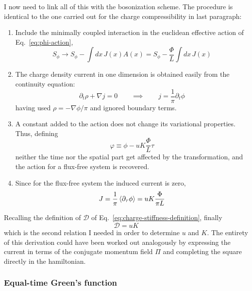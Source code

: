 I now need to link all of this with the bosonization scheme. The procedure is identical to the one carried out for the charge compressibility in last paragraph:
\begin{enumerate}
	\item Include the minimally coupled interaction in the euclidean effective action of Eq.~\eqref{eq:phi-action},
	\[
		S_\phi \to S_\phi - \int dx \, J(x) A(x) = S_\phi - \frac{\Phi}{L} \int dx \, J(x)
	\]
	\item The charge density current in one dimension is obtained easily from the continuity equation:
	\[
		\partial_t \rho + \nabla j = 0
		\qquad\implies\qquad
		j = \frac{1}{\pi} \partial_t \phi
	\]
	having used $\rho = - \nabla \phi/\pi$ and ignored boundary terms.
	\item A constant added to the action does not change its variational properties. Thus, defining
	\[
		\varphi \equiv \phi - uK \frac{\Phi}{L} \tau
	\]
	neither the time nor the spatial part get affected by the transformation, and the action for a flux-free system is recovered.
	\item Since for the flux-free system the induced current is zero,
	\[
		J = \frac{1}{\pi} \ev{\partial_\tau \phi} = uK \frac{\Phi}{\pi L}
	\]
\end{enumerate}
Recalling the definition of $\mathcal{D}$ of Eq.~\eqref{eq:charge-stiffness-definition}, finally
\begin{equation}\label{eq:charge-stiffness}
	\mathcal{D} = uK
\end{equation}
which is the second relation I needed in order to determine $u$ and $K$. The entirety of this derivation could have been worked out analogously by expressing the current in terms of the conjugate momentum field $\Pi$ and completing the square directly in the hamiltonian.

\subsubsection*{Equal-time Green's function}

